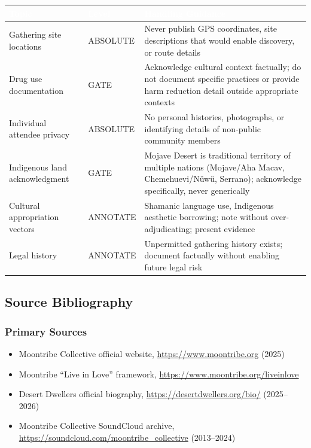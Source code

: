\documentclass[11pt,letterpaper]{article}
\newcommand{\tableheader}[1]{\textbf{\sffamily\textcolor{white}{#1}}}
\begin{document}
\begin{center}
\begin{tabularx}{\textwidth}{L{3.5cm}L{2cm}X}
\toprule
{}
\tableheader{Topic} & \tableheader{Level} & \tableheader{Handling Guidance} \\
\midrule
Gathering site locations & ABSOLUTE & Never publish GPS coordinates, site descriptions that would enable discovery, or route details \\
Drug use documentation & GATE & Acknowledge cultural context factually; do not document specific practices or provide harm reduction detail outside appropriate contexts \\
Individual attendee privacy & ABSOLUTE & No personal histories, photographs, or identifying details of non-public community members \\
Indigenous land acknowledgment & GATE & Mojave Desert is traditional territory of multiple nations (Mojave/Aha Macav, Chemehuevi/Nüwü, Serrano); acknowledge specifically, never generically \\
Cultural appropriation vectors & ANNOTATE & Shamanic language use, Indigenous aesthetic borrowing; note without over-adjudicating; present evidence \\
Legal history & ANNOTATE & Unpermitted gathering history exists; document factually without enabling future legal risk \\
\bottomrule
\end{tabularx}
\end{center}

\subsection{Source Bibliography}

\subsubsection{Primary Sources}

\begin{itemize}[nosep]
  \item Moontribe Collective official website, \url{https://www.moontribe.org} (2025)
  \item Moontribe ``Live in Love'' framework, \url{https://www.moontribe.org/liveinlove}
  \item Desert Dwellers official biography, \url{https://desertdwellers.org/bio/} (2025--2026)
  \item Moontribe Collective SoundCloud archive, \url{https://soundcloud.com/moontribe_collective} (2013--2024)
\end{itemize}
\end{document}
